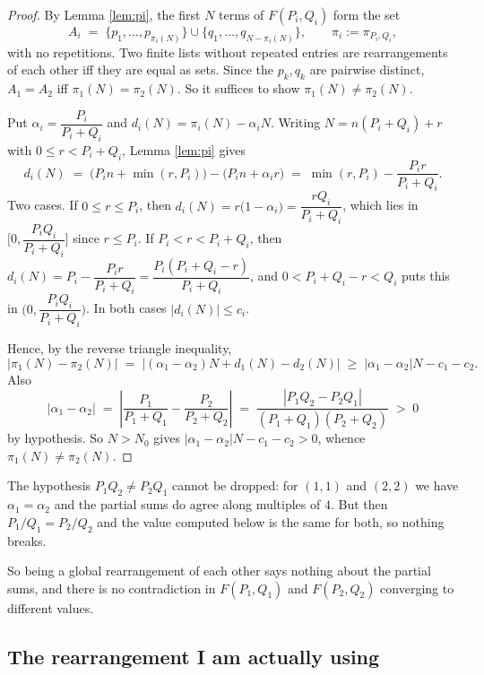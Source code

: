 \documentclass[11pt]{article}
\begin{document}
\begin{proof}
By Lemma \ref{lem:pi}, the first $N$ terms of $F(P_i,Q_i)$ form the set
\[
A_i \;=\; \{ p_1, \dots, p_{\pi_i(N)} \} \cup \{ q_1, \dots, q_{N - \pi_i(N)} \},
\qquad \pi_i := \pi_{P_i,Q_i},
\]
with no repetitions. Two finite lists without repeated entries are rearrangements of each
other iff they are equal as sets. Since the $p_k, q_k$ are pairwise distinct,
$A_1 = A_2$ iff $\pi_1(N) = \pi_2(N)$. So it suffices to show $\pi_1(N) \ne \pi_2(N)$.

Put $\alpha_i = \dfrac{P_i}{P_i+Q_i}$ and $d_i(N) = \pi_i(N) - \alpha_i N$. Writing
$N = n(P_i+Q_i) + r$ with $0 \le r < P_i + Q_i$, Lemma \ref{lem:pi} gives
\[
d_i(N) \;=\; \bigl( P_i n + \min(r,P_i) \bigr) - \bigl( P_i n + \alpha_i r \bigr)
\;=\; \min(r, P_i) - \frac{P_i r}{P_i + Q_i} .
\]
Two cases.
If $0 \le r \le P_i$, then $d_i(N) = r\bigl(1 - \alpha_i\bigr) = \dfrac{r Q_i}{P_i+Q_i}$,
which lies in $\bigl[0, \dfrac{P_i Q_i}{P_i + Q_i}\bigr]$ since $r \le P_i$.
If $P_i < r < P_i + Q_i$, then
$d_i(N) = P_i - \dfrac{P_i r}{P_i+Q_i} = \dfrac{P_i (P_i + Q_i - r)}{P_i + Q_i}$,
and $0 < P_i + Q_i - r < Q_i$ puts this in $\bigl(0, \dfrac{P_i Q_i}{P_i+Q_i}\bigr)$.
In both cases $\left| d_i(N) \right| \le c_i$.

Hence, by the reverse triangle inequality,
\[
\left| \pi_1(N) - \pi_2(N) \right|
\;=\; \left| (\alpha_1 - \alpha_2) N + d_1(N) - d_2(N) \right|
\;\ge\; \left| \alpha_1 - \alpha_2 \right| N - c_1 - c_2 .
\]
Also
\[
\left| \alpha_1 - \alpha_2 \right|
\;=\; \left| \frac{P_1}{P_1+Q_1} - \frac{P_2}{P_2+Q_2} \right|
\;=\; \frac{\left| P_1 Q_2 - P_2 Q_1 \right|}{(P_1+Q_1)(P_2+Q_2)} \;>\; 0
\]
by hypothesis. So $N > N_0$ gives $\left| \alpha_1 - \alpha_2 \right| N - c_1 - c_2 > 0$,
whence $\pi_1(N) \neq \pi_2(N)$.
\end{proof}

The hypothesis $P_1 Q_2 \ne P_2 Q_1$ cannot be dropped: for $(1,1)$ and $(2,2)$ we have
$\alpha_1 = \alpha_2$ and the partial sums do agree along multiples of $4$. But then
$P_1/Q_1 = P_2/Q_2$ and the value computed below is the same for both, so nothing breaks.

So being a global rearrangement of each other says nothing about the partial sums, and
there is no contradiction in $F(P_1,Q_1)$ and $F(P_2,Q_2)$ converging to different values.

\subsection*{The rearrangement I am actually using}
\end{document}
